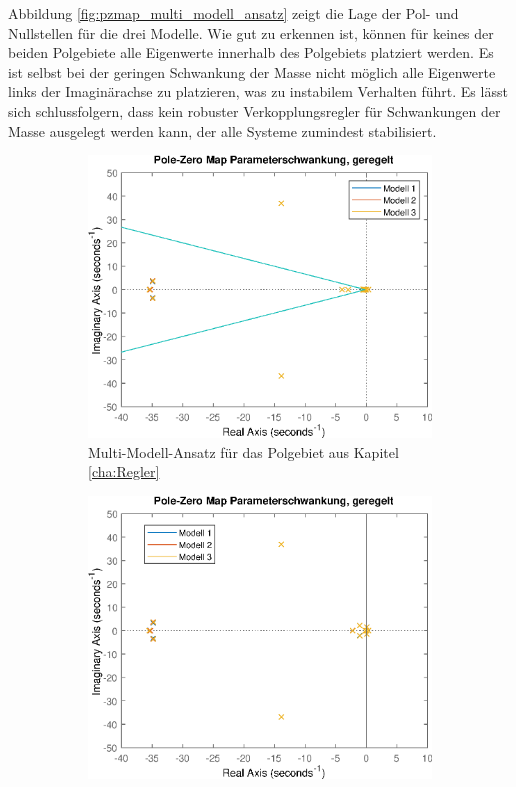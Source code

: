 Abbildung \ref{fig:pzmap_multi_modell_ansatz} zeigt die Lage der Pol- und Nullstellen für die drei Modelle. Wie gut zu erkennen ist, können für keines der beiden Polgebiete alle Eigenwerte innerhalb des Polgebiets platziert werden. Es ist selbst bei der geringen Schwankung der Masse nicht möglich alle Eigenwerte links der Imaginärachse zu platzieren, was zu instabilem Verhalten führt. Es lässt sich schlussfolgern, dass kein robuster Verkopplungsregler für Schwankungen der Masse ausgelegt werden kann, der alle Systeme zumindest stabilisiert. 
\begin{figure}[h] %
	\centering
	\begin{subfigure}{.49\textwidth}
		\centering
		\includegraphics[width=\linewidth]{./Bilder/pzmap_multi_modell_10prozent_hyperbola.eps}
		\caption{Multi-Modell-Ansatz für das Polgebiet aus Kapitel \ref{cha:Regler}}
		\label{fig:pzmap_multi_modell_10prozent_hyperbola}
	\end{subfigure}
	\hfill
	\begin{subfigure}{.49\textwidth}
		\centering
		\includegraphics[width=\linewidth]{./Bilder/pzmap_multi_modell_10prozent_imag.eps}

\end{subfigure}
\end{figure}
